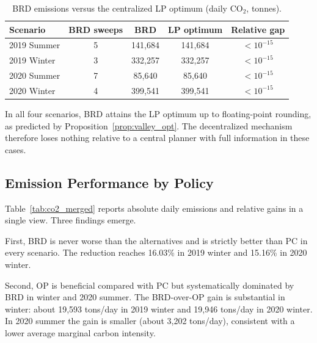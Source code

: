 \documentclass[11pt]{article}
\begin{document}
\begin{table}[H]
\centering
\caption{BRD emissions versus the centralized LP optimum (daily CO$_2$, tonnes).}
\label{tab:central_check}
\begin{tabular}{lcccc}
\toprule
\textbf{Scenario} & \textbf{BRD sweeps} & \textbf{BRD} & \textbf{LP optimum} & \textbf{Relative gap} \\
\midrule
2019 Summer & 5 & 141,684 & 141,684 & $<10^{-15}$ \\
2019 Winter & 3 & 332,257 & 332,257 & $<10^{-15}$ \\
2020 Summer & 7 & 85,640 & 85,640 & $<10^{-15}$ \\
2020 Winter & 4 & 399,541 & 399,541 & $<10^{-15}$ \\
\bottomrule
\end{tabular}
\end{table}

In all four scenarios, BRD attains the LP optimum up to floating-point rounding, as predicted by Proposition~\ref{prop:valley_opt}. The decentralized mechanism therefore loses nothing relative to a central planner with full information in these cases.

\subsection{Emission Performance by Policy}
\label{subsec:co2_performance}

Table~\ref{tab:co2_merged} reports absolute daily emissions and relative gains in a single view. Three findings emerge.

First, BRD is never worse than the alternatives and is strictly better than PC in every scenario. The reduction reaches 16.03\% in 2019 winter and 15.16\% in 2020 winter.

Second, OP is beneficial compared with PC but systematically dominated by BRD in winter and 2020 summer. The BRD-over-OP gain is substantial in winter: about 19,593 tons/day in 2019 winter and 19,946 tons/day in 2020 winter. In 2020 summer the gain is smaller (about 3,202 tons/day), consistent with a lower average marginal carbon intensity.
\end{document}
